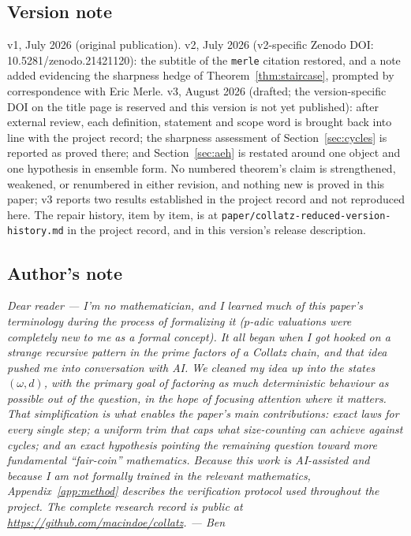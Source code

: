 \documentclass[11pt]{article}
\theoremstyle{remark}
\newcommand{\w}{\omega}
\begin{document}
\subsection*{Version note}
v1, July 2026 (original publication). v2, July 2026 (v2-specific Zenodo DOI: 10.5281/zenodo.21421120): the subtitle of the \texttt{merle} citation restored, and a note added evidencing the sharpness hedge of Theorem~\ref{thm:staircase}, prompted by correspondence with Eric Merle. v3, August 2026 (drafted; the version-specific DOI on the title page is reserved and this version is not yet published): after external review, each definition, statement and scope word is brought back into line with the project record; the sharpness assessment of Section~\ref{sec:cycles} is reported as proved there; and Section~\ref{sec:aeh} is restated around one object and one hypothesis in ensemble form. No numbered theorem's claim is strengthened, weakened, or renumbered in either revision, and nothing new is proved in this paper; v3 reports two results established in the project record and not reproduced here. The repair history, item by item, is at \texttt{paper/collatz-reduced-version-history.md} in the project record, and in this version's release description.

\subsection*{Author's note}

\emph{Dear reader --- I'm no mathematician, and I learned much of this paper's terminology during the process of formalizing it ($p$-adic valuations were completely new to me as a formal concept). It all began when I got hooked on a strange recursive pattern in the prime factors of a Collatz chain, and that idea pushed me into conversation with AI. We cleaned my idea up into the states $(\w,d)$, with the primary goal of factoring as much deterministic behaviour as possible out of the question, in the hope of focusing attention where it matters. That simplification is what enables the paper's main contributions: exact laws for every single step; a uniform trim that caps what size-counting can achieve against cycles; and an exact hypothesis pointing the remaining question toward more fundamental ``fair-coin'' mathematics. Because this work is AI-assisted and because I am not formally trained in the relevant mathematics, Appendix~\ref{app:method} describes the verification protocol used throughout the project. The complete research record is public at \url{https://github.com/macindoe/collatz}. --- Ben}
\end{document}
